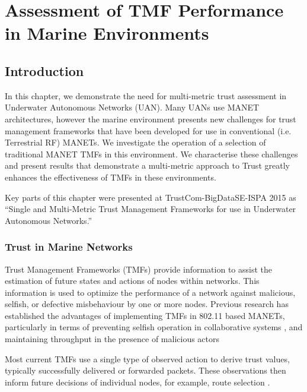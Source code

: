 \def\ChapterTitle{Assessment of TMF Performance in Marine Environments}

\ifx\ifthesis\undefined

\else
\chapter{\ChapterTitle}
\label{Chapter\thechapter}
\fi


\section{Introduction}

In this chapter, we demonstrate the need for multi-metric trust assessment in Underwater Autonomous Networks (UAN).
Many UANs use MANET architectures, however the marine environment presents new challenges for trust management frameworks that have been developed for use in conventional (i.e. Terrestrial RF) MANETs.
We investigate the operation of a selection of traditional MANET TMFs in this environment.
We characterise these challenges and present results that demonstrate a multi-metric approach to Trust greatly enhances the effectiveness of TMFs in these environments.

Key parts of this chapter were presented at TrustCom-BigDataSE-ISPA 2015 as ``Single and Multi-Metric Trust Management Frameworks for use in Underwater Autonomous Networks.''\cite{Bolster2015}

\subsection{Trust in Marine Networks}\label{sec:trust_in_marine}


Trust Management Frameworks (TMFs) provide information to assist the estimation of future states and actions of nodes within networks.
This information is used to optimize the performance of a network against malicious, selfish, or defective misbehaviour by one or more nodes.
Previous research has established the advantages of implementing TMFs in 802.11 based MANETs, particularly in terms of preventing selfish operation in collaborative systems \cite{Li2007}, and maintaining throughput in the presence of malicious actors \cite{Buchegger2002}

Most current TMFs use a single type of observed action to derive trust values, typically successfully delivered or forwarded packets. 
These observations then inform future decisions of individual nodes, for example, route selection \cite{Li2008}.

